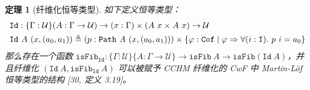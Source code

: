 \documentclass{ctexrep}
\theoremstyle{plain}
\newtheorem{theorem}{定理}[section]
\theoremstyle{definition}
\theoremstyle{remark}
\begin{document}
\begin{theorem}[纤维化恒等类型]
如下定义恒等类型：
\begin{align}
&\mathtt{Id} : \{\Gamma : \mathcal{U}\}(A : \Gamma \to \mathcal{U}) \to (x : \Gamma) \times (A\ x \times A\ x) \to \mathcal{U} \\
&\mathtt{Id}\ A\ (x, (a_0, a_1)) \triangleq (p : \mathtt{Path}\ A\ (x, (a_0, a_1))) \times \{\varphi : \mathtt{Cof} \mid \varphi \Rightarrow \forall(i : \mathtt{I}).\ p\ i = a_0\} \notag
\end{align}
那么存在一个函数 $\mathtt{isFib}_{\mathtt{Id}} : \{\Gamma : \mathcal{U}\}\{A : \Gamma \to \mathcal{U}\} \to \mathtt{isFib}\ A \to \mathtt{isFib}(\mathtt{Id}\ A)$，并且纤维化 $(\mathtt{Id}\ A, \mathtt{isFib}_{\mathtt{Id}}\ A)$ 可以被赋予 CCHM 纤维化的 CwF 中 Martin-Löf 恒等类型的结构 [30, 定义 3.19]。
\end{theorem}
\end{document}
